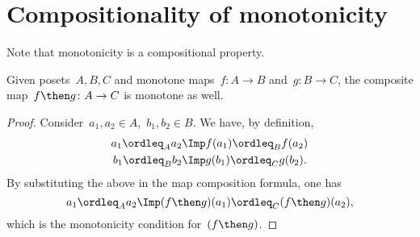 


\section{Compositionality of monotonicity}
Note that monotonicity is a compositional property.
\begin{lemma}
    Given posets~$A, B, C$ and monotone maps~$f\colon A \to B$ and~$g\colon B \to C$, the composite map~$f\then g\colon  A \to C$ is
    monotone as well.
\end{lemma}
\begin{proof}
    Consider~$a_1,a_2 \in A$,~$b_1,b_2\in B$. We have, by definition,
    \begin{equation}
        \begin{aligned}
            a_1\ordleq_A a_2 &\Imp f(a_1)\ordleq_B f(a_2)\\
            b_1\ordleq_B b_2 &\Imp g(b_1)\ordleq_C g(b_2).
        \end{aligned}
    \end{equation}
    By substituting the above in the map composition formula, one has
    \begin{equation}
        a_1\ordleq_A a_2 \Imp (f\then g)(a_1) \ordleq_C (f\then g)(a_2),
    \end{equation}
    which is the monotonicity condition for~$(f\then g)$.
\end{proof}

